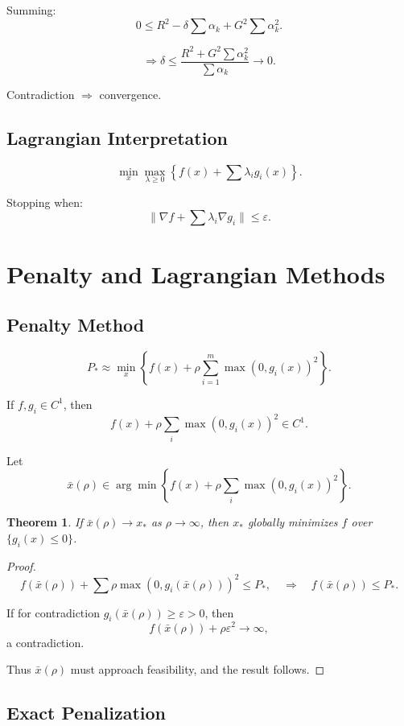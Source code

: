 \documentclass[12pt,oneside]{book}
\numberwithin{equation}{section}
\theoremstyle{definition}
\theoremstyle{plain}
\newtheorem{theorem}{Theorem}[section]
\theoremstyle{remark}
\begin{document}
Summing:
\[
0 \le R^2 - \delta \sum \alpha_k + G^2 \sum \alpha_k^2.
\]

\[
\Rightarrow
\delta \le \frac{R^2 + G^2 \sum \alpha_k^2}{\sum \alpha_k} \to 0.
\]

Contradiction $\Rightarrow$ convergence.

\subsection*{Lagrangian Interpretation}

\[
\min_x \max_{\lambda \ge 0} \left\{ f(x) + \sum \lambda_i g_i(x) \right\}.
\]

Stopping when:
\[
\|\nabla f + \sum \lambda_i \nabla g_i\| \le \varepsilon.
\]

\section{Penalty and Lagrangian Methods}

\subsection{Penalty Method}

\[
P_* \approx \min_x \left\{ f(x) + \rho \sum_{i=1}^m \max(0,g_i(x))^2 \right\}.
\]

If $f,g_i \in C^1$, then
\[
f(x) + \rho \sum_i \max(0,g_i(x))^2 \in C^1.
\]

Let
\[
\bar{x}(\rho) \in \arg\min \left\{ f(x) + \rho \sum_i \max(0,g_i(x))^2 \right\}.
\]

\begin{theorem}
If $\bar{x}(\rho) \to x_*$ as $\rho \to \infty$, then $x_*$ globally minimizes $f$ over $\{g_i(x)\le0\}$.
\end{theorem}

\begin{proof}
\[
f(\bar{x}(\rho)) + \sum \rho \max(0,g_i(\bar{x}(\rho)))^2 \le P_*,
\quad \Rightarrow \quad
f(\bar{x}(\rho)) \le P_*.
\]

If for contradiction $g_i(\bar{x}(\rho)) \ge \varepsilon >0$, then
\[
f(\bar{x}(\rho)) + \rho \varepsilon^2 \to \infty,
\]
a contradiction.

Thus $\bar{x}(\rho)$ must approach feasibility, and the result follows.
\end{proof}

\subsection*{Exact Penalization}
\end{document}
